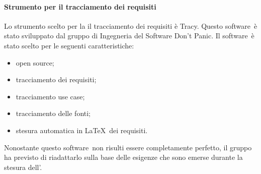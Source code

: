 \documentclass[../NormeProgetto.tex]{subfiles}
\begin{document}
			\paragraph{Strumento per il tracciamento dei requisiti}
			Lo strumento scelto per la il tracciamento dei requisiti è Tracy\g. Questo software\g\ è stato sviluppato dal gruppo di Ingegneria del Software Don't Panic. Il software\g\ è stato scelto per le seguenti caratteristiche:
			\begin{itemize}
				\item open source\g;
				\item tracciamento dei requisiti;
				\item tracciamento use case;
				\item tracciamento delle fonti;
				\item stesura automatica in \LaTeX\g\ dei requisiti.
			\end{itemize}
			Nonostante questo software\g\ non risulti essere completamente perfetto, il gruppo ha previsto di riadattarlo sulla base delle esigenze che sono emerse durante la stesura dell'\analisideirequisiti.
			
\end{document}
